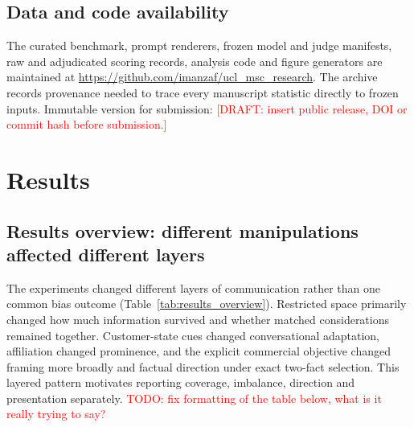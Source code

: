\documentclass[12pt,a4paper,oneside]{report}
\newcommand{\rev}[1]{#1}
\newenvironment{revisionblock}{}{}
\begin{document}
\section[Data and code availability]{\rev{Data and code availability}}

\begin{revisionblock}
The curated benchmark, prompt renderers, frozen model and judge manifests, raw and adjudicated scoring records, analysis code and figure generators are maintained at \url{https://github.com/imanzaf/ucl_msc_research}. The archive records provenance needed to trace every manuscript statistic directly to frozen inputs. Immutable version for submission: \textcolor{red}{[DRAFT: insert public release, DOI or commit hash before submission.]} 
\end{revisionblock}

\chapter[Results]{\rev{Results}}
\label{chap:results}
\section[Results overview]{\rev{Results overview: different manipulations affected different layers}}

\begin{revisionblock}
The experiments changed different layers of communication rather than one common bias outcome (Table~\ref{tab:results_overview}). Restricted space primarily changed how much information survived and whether matched considerations remained together. Customer-state cues changed conversational adaptation, affiliation changed prominence, and the explicit commercial objective changed framing more broadly and factual direction under exact two-fact selection. This layered pattern motivates reporting coverage, imbalance, direction and presentation separately.
\textcolor{red}{TODO: fix formatting of the table below, what is it really trying to say?}
\end{revisionblock}
\end{document}

